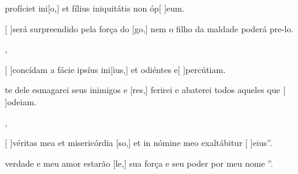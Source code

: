{  {\item {} profíciet ini[o,] et fílius iniquitátis non óp[ ]{e}um.~\Antiphona}%
    {\item {}[ ]{se}rá surpreendido pela força do [go,] nem o filho da maldade poderá pre-lo.~\Antiphona},
  {\item {}[ ]{con}cídam a fácie ipsíus ini[ius,] et odiéntes e[ ]{per}{cú}tiam.~\Antiphona}%
    {\item {}te dele esmagarei seus inimigos e [res,] ferirei e abaterei todos aqueles que [ ]{o}{dei}am.~\Antiphona},
  {\item {}[ ]{vé}ritas mea et misericórdia [so,] et in nómine meo exaltábitur [ ]{e}ius''.~\Antiphona}%
    {\item {} verdade e meu amor estarão [le,] sua força e seu poder por meu nome ''.~\Antiphona}
}